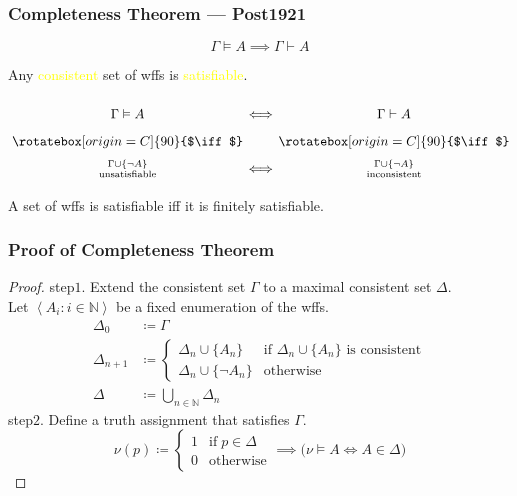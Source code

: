\documentclass[UTF8,11pt,colorlinks,compress,openany]{beamer}%
\begin{document}
\begin{frame}\frametitle{Completeness Theorem --- Post1921}
		\begin{theorem}
			\[\Gamma\vDash A\implies\Gamma\vdash A\]
		\end{theorem}
		\begin{corollary}
			Any \textcolor{yellow}{consistent} set of wffs is \textcolor{yellow}{satisfiable}.
		\end{corollary}\vspace*{-3ex}
			{\Large \[\arraycolsep=0.7pt\def\arraystretch{1.7}
					\begin{array}{cccc}
					&\Gamma\vDash A&\iff&\Gamma\vdash A\\
					&\rotatebox[origin=C]{90}{$\iff$}&&\rotatebox[origin=C]{90}{$\iff$}\\
					&\Gamma\cup\{\neg A\}\atop{\text{unsatisfiable}}&\iff&\Gamma\cup\{\neg A\}\atop{\text{inconsistent}}
					\end{array}
					\]}
		\begin{corollary}
			A set of wffs is satisfiable iff it is finitely satisfiable.
		\end{corollary}
\end{frame}

\begin{frame}\frametitle{Proof of Completeness Theorem}
	\begin{proof}
		step$1$. Extend the consistent set $\Gamma$ to a maximal consistent set $\Delta$.\\
		Let $\left\langle A_i: i\in\mathbb{N}\right\rangle$ be a fixed enumeration of the wffs.
		\begin{align*}
		\Delta_0&\coloneqq \Gamma\\
		\Delta_{n+1}&\coloneqq 
		\begin{cases}
		\Delta_n\cup\{A_n\} &\text{if $\Delta_n\cup\{A_n\}$ is consistent}\\
		\Delta_n\cup\{\neg A_n\} &\text{otherwise}
		\end{cases}\\
		\Delta&\coloneqq \bigcup\limits_{n\in\mathbb{N}}\Delta_n
		\end{align*}
		step$2$. Define a truth assignment that satisfies $\Gamma$.
		\[\nu(p)\coloneqq 
		\begin{cases}
		1 &\text{if}\; p\in\Delta\\
		0 &\text{otherwise}
		\end{cases}\implies\big(\nu\vDash A\iff A\in\Delta\big)\]
	\end{proof}
\end{frame}
\end{document}
